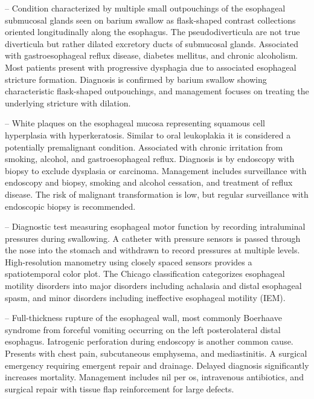 -- Condition characterized by multiple small outpouchings of the esophageal submucosal glands seen on barium swallow as flask-shaped contrast collections oriented longitudinally along the esophagus. The pseudodiverticula are not true diverticula but rather dilated excretory ducts of submucosal glands. Associated with gastroesophageal reflux disease, diabetes mellitus, and chronic alcoholism. Most patients present with progressive dysphagia due to associated esophageal stricture formation. Diagnosis is confirmed by barium swallow showing characteristic flask-shaped outpouchings, and management focuses on treating the underlying stricture with dilation.

-- White plaques on the esophageal mucosa representing squamous cell hyperplasia with hyperkeratosis. Similar to oral leukoplakia it is considered a potentially premalignant condition. Associated with chronic irritation from smoking, alcohol, and gastroesophageal reflux. Diagnosis is by endoscopy with biopsy to exclude dysplasia or carcinoma. Management includes surveillance with endoscopy and biopsy, smoking and alcohol cessation, and treatment of reflux disease. The risk of malignant transformation is low, but regular surveillance with endoscopic biopsy is recommended.

-- Diagnostic test measuring esophageal motor function by recording intraluminal pressures during swallowing. A catheter with pressure sensors is passed through the nose into the stomach and withdrawn to record pressures at multiple levels. High-resolution manometry using closely spaced sensors provides a spatiotemporal color plot. The Chicago classification categorizes esophageal motility disorders into major disorders including achalasia and distal esophageal spasm, and minor disorders including ineffective esophageal motility (IEM).

-- Full-thickness rupture of the esophageal wall, most commonly Boerhaave syndrome from forceful vomiting occurring on the left posterolateral distal esophagus. Iatrogenic perforation during endoscopy is another common cause. Presents with chest pain, subcutaneous emphysema, and mediastinitis. A surgical emergency requiring emergent repair and drainage. Delayed diagnosis significantly increases mortality. Management includes nil per os, intravenous antibiotics, and surgical repair with tissue flap reinforcement for large defects.

